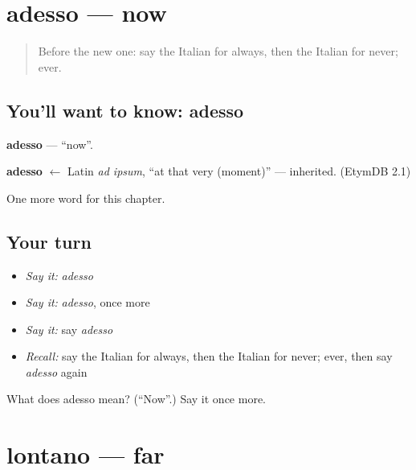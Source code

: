 \section[adesso]{adesso — now}

\label{lesson:IT-C79-adesso}



\begin{quote}
Before the new one: say the Italian for always, then the Italian for never; ever.
\end{quote}

\subsection*{You'll want to know: adesso}
\textbf{adesso} — \textquotedblleft{}now\textquotedblright{}.

\begin{cousinweb}
\textbf{adesso} $\leftarrow$ Latin \emph{ad ipsum}, \textquotedblleft{}at that very (moment)\textquotedblright{} — inherited. (EtymDB 2.1)
\end{cousinweb}

\begin{grammarlens}[title={What you've built}]
One more word for this chapter.
\end{grammarlens}

\subsection*{Your turn}
\begin{itemize}
\raggedright
  \item \emph{Say it:} \emph{adesso}
  \item \emph{Say it:} \emph{adesso}, once more
  \item \emph{Say it:} say \emph{adesso}
  \item \emph{Recall:} say the Italian for always, then the Italian for never; ever, then say \emph{adesso} again
\end{itemize}

\begin{tcolorbox}[breakable,colback=teal!4,colframe=teal!35!black,title={Before you move on}]
What does adesso mean? (\textquotedblleft{}Now\textquotedblright{}.) Say it once more.
\end{tcolorbox}
\section[lontano]{lontano — far}

